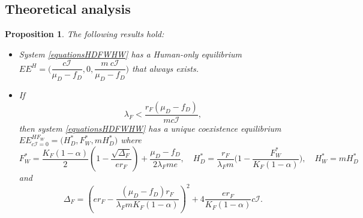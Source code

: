 \documentclass{article}
\newcommand{\lfw}{\lambda_{F}}
\newcommand{\lfw}{\lambda_{F}}
\newtheorem{prop}{Proposition}
\begin{document}
\subsection{Theoretical analysis}
\begin{prop}
The following results hold:
\begin{itemize}
\item System \eqref{equationsHDFWHW} has a Human-only equilibrium $EE^{H} = \Big(\dfrac{c\mathcal{I}}{\mu_D - f_D}, 0, \dfrac{m \ c\mathcal{I}}{\mu_D - f_D} \Big)$ that always exists.
\item If $$ \lfw < \dfrac{r_F (\mu_D -f_D)}{m c\mathcal{I}},$$ then system \eqref{equationsHDFWHW} has a unique coexistence equilibrium $EE^{HF_W}_{c\mathcal{I} = 0} = \Big(H^*_{D}, F^*_{W}, m H^*_{D} \Big)$
where
$$F^*_{W} = \dfrac{K_F(1-\alpha)}{2}\left(1 - \dfrac{\sqrt{\Delta_F}}{er_F}\right) + \dfrac{\mu_D - f_D}{2\lfw m e},\quad
H^*_{D} = \dfrac{r_F}{\lfw m} \Big(1 - \dfrac{F^*_{W}}{K_F(1-\alpha)} \Big),
\quad 
H^*_{W} = m H^*_{D}$$
and
$$
\Delta_F = \left(er_F - \dfrac{(\mu_D - f_D) r_F}{\lfw m K_F(1-\alpha)} \right)^2 + 4\dfrac{er_F}{K_F(1-\alpha)}  c\mathcal{I}.
$$
\end{itemize} 
\end{prop}
\end{document}
